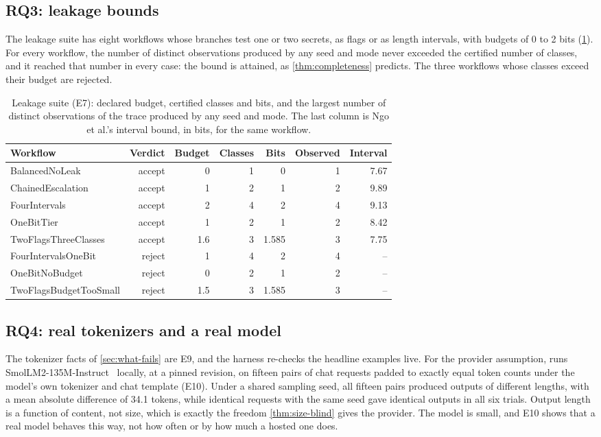 \subsection{RQ3: leakage bounds}\label{sec:eval-leakage}

The leakage suite has eight workflows whose branches test one or two secrets, as
flags or as length intervals, with budgets of 0 to 2 bits (\cref{tab:leakage}). For every workflow, the
number of distinct observations produced by any seed and mode never exceeded the
certified number of classes, and it reached that number in every case: the bound is
attained, as \cref{thm:completeness} predicts. The three workflows whose classes
exceed their budget are rejected.

\begin{table}[t]
\centering
\caption{Leakage suite (E7): declared budget, certified classes and bits, and the largest
number of distinct observations of the trace produced by any seed and mode. The last column
is Ngo et al.'s interval bound, in bits, for the same workflow.}
\label{tab:leakage}
\footnotesize
\begin{tabular}{@{}lrrrrrr@{}}
\toprule
Workflow & Verdict & Budget & Classes & Bits & Observed & Interval \\
\midrule
BalancedNoLeak & accept & 0 & 1 & 0 & 1 & 7.67 \\
ChainedEscalation & accept & 1 & 2 & 1 & 2 & 9.89 \\
FourIntervals & accept & 2 & 4 & 2 & 4 & 9.13 \\
OneBitTier & accept & 1 & 2 & 1 & 2 & 8.42 \\
TwoFlagsThreeClasses & accept & 1.6 & 3 & 1.585 & 3 & 7.75 \\
FourIntervalsOneBit & reject & 1 & 4 & 2 & 4 & -- \\
OneBitNoBudget & reject & 0 & 2 & 1 & 2 & -- \\
TwoFlagsBudgetTooSmall & reject & 1.5 & 3 & 1.585 & 3 & -- \\
\bottomrule
\end{tabular}
\end{table}

\subsection{RQ4: real tokenizers and a real model}\label{sec:eval-models}

The tokenizer facts of \cref{sec:what-fails} are E9, and the harness re-checks the
headline examples live. For the provider assumption, 
runs SmolLM2-135M-Instruct~\cite{allal2025smollm2,smollm2instruct135m} locally, at a
pinned revision, on fifteen pairs of chat requests padded to exactly equal token
counts under the model's own tokenizer and chat template (E10). Under a shared
sampling seed, all fifteen pairs produced outputs of different lengths, with a mean
absolute difference of 34.1 tokens, while identical requests with the same seed gave
identical outputs in all six trials. Output length is a function of content, not
size, which is exactly the freedom \cref{thm:size-blind} gives the provider. The model
is small, and E10 shows that a real model behaves this way, not how often or by how
much a hosted one does.


